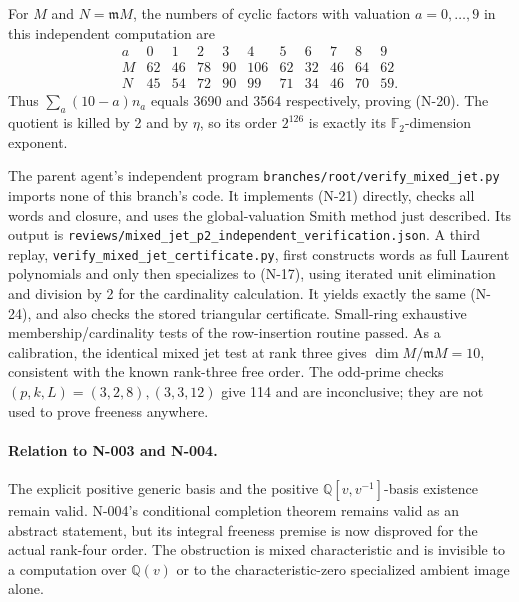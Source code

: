 For $M$ and $N=\mathfrak mM$, the numbers of cyclic factors with
valuation $a=0,\ldots,9$ in this independent computation are
\[
\begin{array}{c|rrrrrrrrrr}
a&0&1&2&3&4&5&6&7&8&9\\\hline
M&62&46&78&90&106&62&32&46&64&62\\
N&45&54&72&90&99&71&34&46&70&59.
\end{array}
\tag{N-24}
\]
Thus $\sum_a(10-a)n_a$ equals 3690 and 3564 respectively, proving
(N-20).  The quotient is killed by 2 and by $\eta$, so its order
$2^{126}$ is exactly its $\mathbb F_2$-dimension exponent.

The parent agent's independent program
\nolinkurl{branches/root/verify_mixed_jet.py} imports none of this
branch's code.  It implements (N-21) directly, checks all words and
closure, and uses the global-valuation Smith method just described.
Its output is
\nolinkurl{reviews/mixed_jet_p2_independent_verification.json}.
A third replay, \nolinkurl{verify_mixed_jet_certificate.py}, first
constructs words as full Laurent polynomials and only then specializes
to (N-17), using iterated unit elimination and division by 2 for the
cardinality calculation.  It yields exactly the same (N-24), and
also checks the stored triangular certificate.  Small-ring exhaustive
membership/cardinality tests of the row-insertion routine passed.
As a calibration, the identical mixed jet test at rank three gives
$\dim M/\mathfrak mM=10$, consistent with the known rank-three free
order.  The odd-prime checks $(p,k,L)=(3,2,8),(3,3,12)$ give 114 and
are inconclusive; they are not used to prove freeness anywhere.

\paragraph{Relation to N-003 and N-004.}
The explicit positive generic basis and the positive
$\mathbb Q[v,v^{-1}]$-basis existence remain valid.  N-004's conditional
completion theorem remains valid as an abstract statement, but its
integral freeness premise is now disproved for the actual rank-four
order.  The obstruction is mixed characteristic and is invisible to
a computation over $\mathbb Q(v)$ or to the characteristic-zero
specialized ambient image alone.
